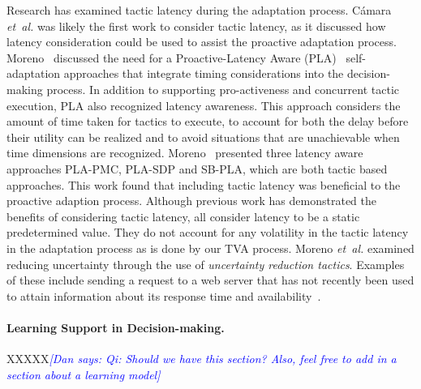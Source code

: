 \documentclass[12pt]{article}
\newcommand{\etal}{\emph{et~al.}\xspace}
\newcommand{\dan}[1]{\textcolor{blue}{{\it [Dan says: #1]}}}
\begin{document}
Research has examined tactic latency during the adaptation process. C{\'a}mara \etal\cite{camara2014stochastic} was likely the first work to consider tactic latency, as it discussed how latency consideration could be used to assist the proactive adaptation process. Moreno~\cite{moreno2017adaptation, Moreno:2018:FED:3208359.3149180} discussed the need for a Proactive-Latency Aware (PLA)~\cite{moreno2015proactive, camara2014stochastic} self-adaptation approaches that integrate timing considerations into the decision-making process. In addition to supporting pro-activeness and concurrent tactic execution, PLA also recognized latency awareness. This approach considers the amount of time taken for tactics to execute, to account for both the delay before their utility can be realized and to avoid situations that are unachievable when time dimensions are recognized. Moreno~\cite{moreno2017adaptation} presented three latency aware approaches PLA-PMC, PLA-SDP and SB-PLA, which are both tactic based approaches. This work found that including tactic latency was beneficial to the proactive adaption process. Although previous work has demonstrated the benefits of considering tactic latency, all consider latency to be a static predetermined value. They do not account for any volatility in the tactic latency in the adaptation process as is done by our TVA process. Moreno \etal\cite{moreno2018uncertainty} examined reducing uncertainty through the use of {\em uncertainty reduction tactics}. Examples of these include sending a request to a web server that has not recently been used to attain information about its response time and availability~\cite{Hielscher:2008:FPS:1504902.1504917}.%




\vspace{-3mm}\paragraph{Learning Support in Decision-making.}
XXXXX\dan{Qi: Should we have this section? Also, feel free to add in a section about a learning model}
\end{document}
